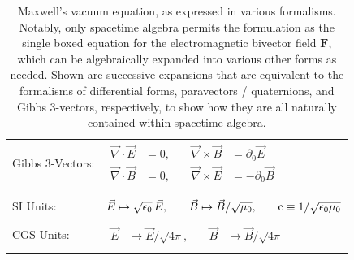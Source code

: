 \documentclass[1p,sort&compress]{elsarticle}
\numberwithin{equation}{section}
\newcommand{\rv}[1]{\vec{#1}}
\newcommand{\bv}[1]{\mathbf{#1}}
\newcommand{\cc}{{\rm c}}
\begin{document}
\begin{table}
\begin{tabular}{l l}
      \\
    Gibbs 3-Vectors: & {$\begin{aligned}\rv{\nabla}\cdot\rv{E} &= 0 , &\quad \rv{\nabla}\times\rv{B} &= \partial_0 \rv{E} \\
      \rv{\nabla}\cdot\rv{B} &= 0 , &\quad \rv{\nabla}\times\rv{E} &= - \partial_0 \rv{B}\end{aligned}$} \\
    \\
    \hline
    \\
    SI Units: & {$\begin{aligned}\rv{E} &\mapsto \sqrt{\epsilon_0}\,\rv{E}, &\quad \rv{B} &\mapsto \rv{B}/\sqrt{\mu_0}, &\quad \cc \equiv 1/\sqrt{\epsilon_0\mu_0}\end{aligned}$} \\
    \\
    CGS Units: & {$\begin{aligned}\rv{E} &\mapsto \rv{E}/\sqrt{4\pi}, &\quad \rv{B} &\mapsto \rv{B}/\sqrt{4\pi}\end{aligned}$} \\
    \\
    \hline 
 \end{tabular}
 \caption[Maxwell's vacuum equation]{Maxwell's vacuum equation, as expressed in various formalisms.  Notably, only spacetime algebra permits the formulation as the single boxed equation for the electromagnetic bivector field $\bv{F}$, which can be algebraically expanded into various other forms as needed.  Shown are successive expansions that are equivalent to the formalisms of differential forms, paravectors / quaternions, and Gibbs 3-vectors, respectively, to show how they are all naturally contained within spacetime algebra.}
 \label{tab:vacuummaxwell}
\end{table}
\end{document}
